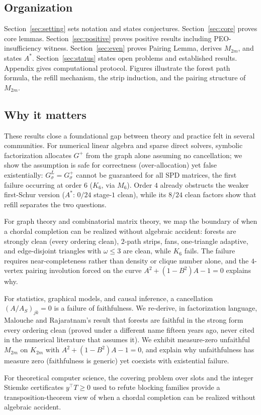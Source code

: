 \documentclass[11pt]{article}
\theoremstyle{plain}
\theoremstyle{definition}
\begin{document}
\begin{humanblock}
\subsection{Organization}

Section~\ref{sec:setting} sets notation and states conjectures. Section~\ref{sec:core} proves core lemmas. Section~\ref{sec:positive} proves positive results including PEO-insufficiency witness. Section~\ref{sec:even} proves Pairing Lemma, derives $M_{2m}$, and states $A^*$. Section~\ref{sec:status} states open problems and established results. Appendix gives computational protocol. Figures illustrate the forest path formula, the refill mechanism, the strip induction, and the pairing structure of $M_{2m}$.

\subsection{Why it matters}\label{sec:why}
These results close a foundational gap between theory and practice felt in several communities. For numerical linear algebra and sparse direct solvers, symbolic factorization allocates $G^+$ from the graph alone assuming no cancellation; we show the assumption is safe for correctness (over-allocation) yet false existentially: $G^L_\sigma=G^+_\sigma$ cannot be guaranteed for all SPD matrices, the first failure occurring at order $6$ ($K_6$, via $M_6$). Order $4$ already obstructs the weaker first-Schur version ($A^*$: $0/24$ stage-$1$ clean), while its $8/24$ clean factors show that refill separates the two questions.

For graph theory and combinatorial matrix theory, we map the boundary of when a chordal completion can be realized without algebraic accident: forests are strongly clean (every ordering clean), $2$-path strips, fans, one-triangle adaptive, and edge-disjoint triangles with $\omega\le3$ are clean, while $K_6$ fails. The failure requires near-completeness rather than density or clique number alone, and the $4$-vertex pairing involution forced on the curve $A^2+(1-B^2)A-1=0$ explains why.

For statistics, graphical models, and causal inference, a cancellation $(A/A_S)_{jk}=0$ is a failure of faithfulness. We re-derive, in factorization language, Malouche and Rajaratnam's result that forests are faithful in the strong form every ordering clean (proved under a different name fifteen years ago, never cited in the numerical literature that assumes it). We exhibit measure-zero unfaithful $M_{2m}$ on $K_{2m}$ with $A^2+(1-B^2)A-1=0$, and explain why unfaithfulness has measure zero (faithfulness is generic) yet coexists with existential failure.

For theoretical computer science, the covering problem over slots and the integer Stiemke certificates $y^\top T\ge0$ used to refute blocking families provide a transposition-theorem view of when a chordal completion can be realized without algebraic accident.
\end{humanblock}
\end{document}
